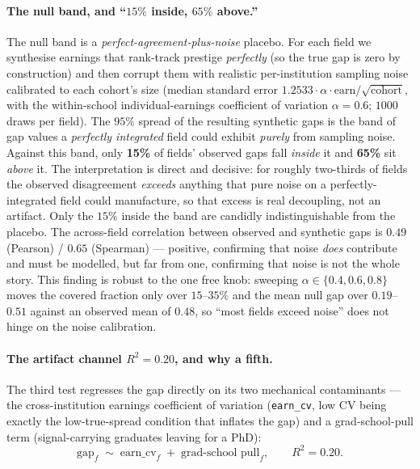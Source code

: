 \documentclass[11pt]{article}
\begin{document}
\paragraph{The null band, and ``$15\%$ inside, $65\%$ above.''}
The null band is a \emph{perfect-agreement-plus-noise} placebo. For each field we synthesise earnings that rank-track prestige \emph{perfectly} (so the true gap is zero by construction) and then corrupt them with realistic per-institution sampling noise calibrated to each cohort's size (median standard error $1.2533\cdot\alpha\cdot\mathrm{earn}/\sqrt{\mathrm{cohort}}$, with the within-school individual-earnings coefficient of variation $\alpha=0.6$; $1000$ draws per field). The $95\%$ spread of the resulting synthetic gaps is the band of gap values a \emph{perfectly integrated} field could exhibit \emph{purely} from sampling noise. Against this band, only \textbf{15\%} of fields' observed gaps fall \emph{inside} it and \textbf{65\%} sit \emph{above} it. The interpretation is direct and decisive: for roughly two-thirds of fields the observed disagreement \emph{exceeds} anything that pure noise on a perfectly-integrated field could manufacture, so that excess is real decoupling, not an artifact. Only the $15\%$ inside the band are candidly indistinguishable from the placebo. The across-field correlation between observed and synthetic gaps is $0.49$ (Pearson) / $0.65$ (Spearman) --- positive, confirming that noise \emph{does} contribute and must be modelled, but far from one, confirming that noise is not the whole story. This finding is robust to the one free knob: sweeping $\alpha\in\{0.4,0.6,0.8\}$ moves the covered fraction only over $15$--$35\%$ and the mean null gap over $0.19$--$0.51$ against an observed mean of $0.48$, so ``most fields exceed noise'' does not hinge on the noise calibration.

\paragraph{The artifact channel $R^2=0.20$, and why a fifth.}
The third test regresses the gap directly on its two mechanical contaminants --- the cross-institution earnings coefficient of variation (\texttt{earn\_cv}, low CV being exactly the low-true-spread condition that inflates the gap) and a grad-school-pull term (signal-carrying graduates leaving for a PhD):
\[
\mathrm{gap}_f \;\sim\; \mathrm{earn\_cv}_f \;+\; \text{grad-school pull}_f, \qquad R^2 = 0.20.
\]
\end{document}
